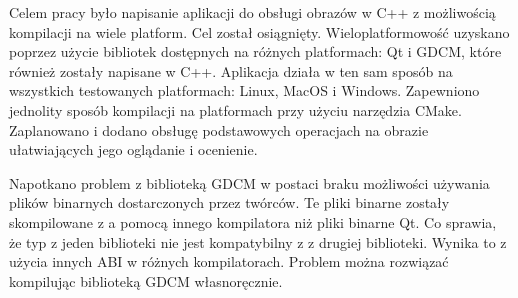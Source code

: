 \par
Celem pracy było napisanie aplikacji do obsługi obrazów \DICOM w C++ z możliwością kompilacji na wiele platform.
Cel został osiągnięty.
Wieloplatformowość uzyskano poprzez użycie bibliotek dostępnych na różnych platformach: Qt i GDCM, które również zostały napisane w C++.
Aplikacja działa w ten sam sposób na wszystkich testowanych platformach: Linux, MacOS i Windows.
Zapewniono jednolity sposób kompilacji na platformach przy użyciu narzędzia CMake.
Zaplanowano i dodano obsługę podstawowych operacjach na obrazie ułatwiających jego oglądanie i ocenienie.
\par
Napotkano problem z biblioteką GDCM w postaci braku możliwości używania plików binarnych dostarczonych przez twórców.
Te pliki binarne zostały skompilowane z a pomocą innego kompilatora niż pliki binarne Qt.
Co sprawia, że typ  z jeden biblioteki nie jest kompatybilny z  z drugiej biblioteki.
Wynika to z użycia innych ABI w różnych kompilatorach.
Problem można rozwiązać kompilując biblioteką GDCM własnoręcznie.